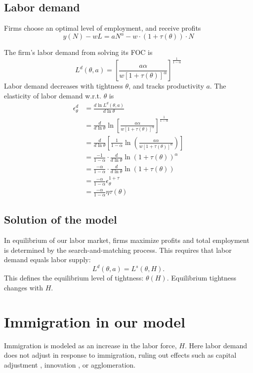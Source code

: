\documentclass[12pt]{article}
\begin{document}
\subsection{Labor demand}
Firms choose an optimal level of employment, and receive profits
\begin{equation}
    y(N) - wL = a N^\alpha - w \cdot (1+\tau(\theta)) \cdot N
\end{equation}

The firm's labor demand from solving its FOC is
\begin{equation}
    L^d(\theta, a) = \left[ \frac{a \alpha}{w [1 + \tau(\theta)]^\alpha} \right]^{\frac{1}{1-\alpha}}
\end{equation}
Labor demand decreases with tightness $\theta$, and tracks productivity $a$.
The elasticity of labor demand w.r.t. $\theta$ is
\begin{align*}
    \epsilon^d_\theta &= \frac{d \ln L^d(\theta, a)}{d \ln \theta} \\
    &= \frac{d}{d \ln \theta} \ln \left[ \frac{a \alpha}{w [1 + \tau(\theta)]^\alpha} \right]^{\frac{1}{1-\alpha}} \\
    &= \frac{d}{d \ln \theta} \left[ \frac{1}{1-\alpha} \ln \left( \frac{a \alpha}{w [1 + \tau(\theta)]^\alpha} \right) \right] \\
    &= \frac{-1}{1-\alpha} \cdot \frac{d}{d \ln \theta} \ln \left( 1 + \tau(\theta) \right)^\alpha \\
    &= \frac{-\alpha}{1-\alpha} \cdot \frac{d}{d \ln \theta} \ln \left(1 + \tau(\theta) \right) \\
    &= \frac{-\alpha}{1-\alpha} \epsilon^{1+\tau}_\theta \\&= \frac{-\alpha}{1-\alpha} \eta \tau(\theta)
\end{align*}

\subsection{Solution of the model}
In equilibrium of our labor market, firms maximize profits and total employment is determined by the search-and-matching process.
This requires that labor demand equals labor supply:
\begin{equation} \label{eq:equilibrium_condition}
    L^d(\theta, a) = L^s(\theta, H).
\end{equation}
This defines the equilibrium level of tightness: $\theta(H)$.
Equilibrium tightness changes with $H$.

\section{Immigration in our model}
Immigration is modeled as an increase in the labor force, $H$.
Here labor demand does not adjust in response to immigration, ruling out effects such as capital adjustment \parencite{lewis_QJE_2011_immigration_less_automation, peri_REStat_2012_immigration_unskilled_intensive_technology}, innovation \parencite{keri_NBERWP_2013_high_skilled_immigration_review, burchardi_chaney_hassan_tarquinio_terry_NBERWP_2020_immigration_innovation}, or agglomeration.
\end{document}
